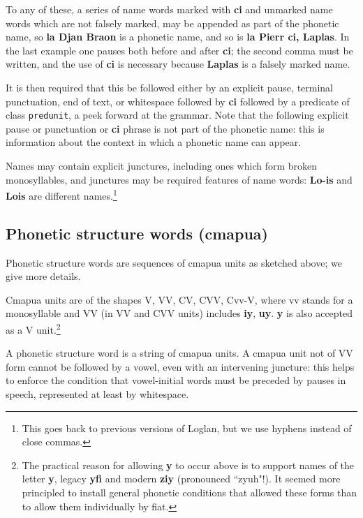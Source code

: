 \documentclass[12pt]{book}
\begin{document}
To any of these, a series of name words marked with {\bf ci} and unmarked name words  which are not falsely marked, may be appended as part of the phonetic name,
so {\bf la Djan Braon} is a phonetic name, and so is {\bf la Pierr ci, Laplas}.  In the last example one pauses both before and after {\bf ci};  the second comma must be written, and the use of {\bf ci} is necessary because {\bf Laplas} is a falsely marked name.

It is then required that this be followed either by an explicit pause, terminal punctuation, end of text, or whitespace followed by {\bf ci} followed by a predicate of class {\tt predunit}, a peek forward at the grammar.  Note that the following explicit pause or punctuation or {\bf ci} phrase is not part of the phonetic name:  this is information about the context in which a phonetic name can appear.

Names may contain explicit junctures, including ones which form broken monosyllables, and junctures may be required features of name words:  {\bf Lo-is} and {\bf Lois} are different names.\footnote{This goes back to previous versions of Loglan, but we use hyphens instead of close commas.}

\subsection{Phonetic structure words (cmapua)}

Phonetic structure words are sequences of cmapua units as sketched above;  we give more details.

Cmapua units are of the shapes V, VV, CV, CVV, Cvv-V, where vv stands for a monosyllable and VV (in VV and CVV units) includes {\bf iy}, {\bf uy}.  {\bf y} is also accepted as a V unit.\footnote{The practical reason for allowing {\bf y} to occur above is to support names of the letter {\bf y}, legacy {\bf yfi} and modern {\bf ziy} (pronounced ``zyuh"!).  It seemed more principled to install general phonetic conditions that allowed these forms than to allow them individually by fiat.}

A phonetic structure word is a string of cmapua units.  A cmapua unit not of VV form cannot be followed by a vowel, even with an intervening juncture:  this helps to enforce
the condition that vowel-initial words must be preceded by pauses in speech, represented at least by whitespace. 
\end{document}
